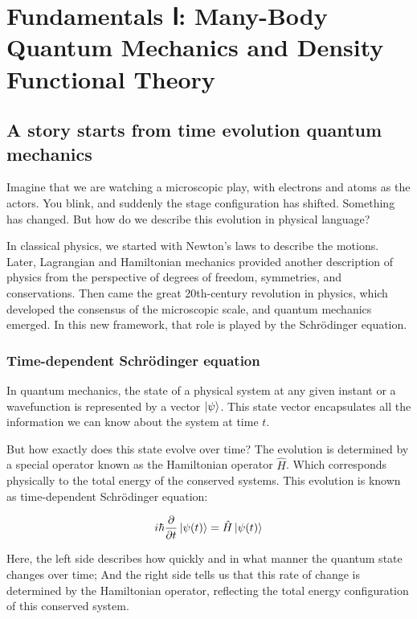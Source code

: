 \chapter{Fundamentals Ⅰ: Many-Body Quantum Mechanics and Density Functional Theory\label{cha:fundamentals_a}}

\section{A story starts from time evolution quantum mechanics}

Imagine that we are watching a microscopic play, with electrons and atoms as the actors. You blink, and suddenly the stage configuration has shifted. Something has changed. But how do we describe this evolution in physical language?

In classical physics, we started with Newton’s laws to describe the motions. Later, Lagrangian and Hamiltonian mechanics provided another description of physics from the perspective of degrees of freedom, symmetries, and conservations. Then came the great 20th-century revolution in physics, which developed the consensus of the microscopic scale, and quantum mechanics emerged. In this new framework, that role is played by the Schrödinger equation.

\subsection{Time-dependent Schrödinger equation}

In quantum mechanics, the state of a physical system at any given instant or a wavefunction is represented by a vector $\ket{\psi}$. This state vector encapsulates all the information we can know about the system at time $t$.

But how exactly does this state evolve over time? The evolution is determined by a special operator known as the Hamiltonian operator $\hat{H}$. Which corresponds physically to the total energy of the conserved systems. This evolution is known as time-dependent Schrödinger equation:

\begin{equation}
    i\hbar\frac{\partial}{\partial t}\ket{\psi(t)}=\hat{H}\ket{\psi(t)}
    \label{tdse}
\end{equation}

Here, the left side describes how quickly and in what manner the quantum state changes over time; And the right side tells us that this rate of change is determined by the Hamiltonian operator, reflecting the total energy configuration of this conserved system. 


